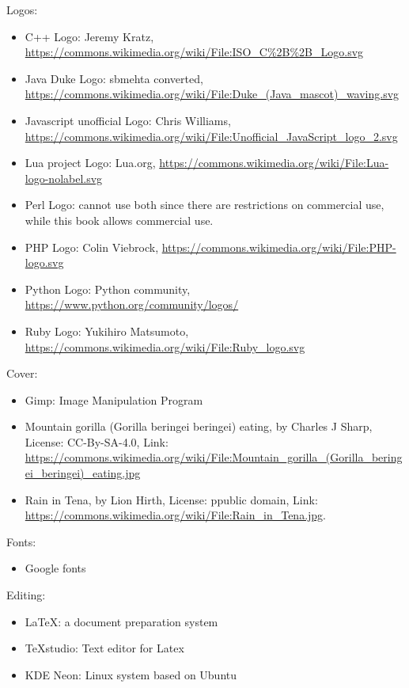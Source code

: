 \documentclass[12pt]{book}
\begin{document}
Logos: 
\begin{itemize}
	\item C++ Logo: Jeremy Kratz, \url{https://commons.wikimedia.org/wiki/File:ISO_C\%2B\%2B_Logo.svg}
	\item Java Duke Logo: sbmehta converted, \url{https://commons.wikimedia.org/wiki/File:Duke_(Java_mascot)_waving.svg}
	\item Javascript unofficial Logo: Chris Williams,  \url{https://commons.wikimedia.org/wiki/File:Unofficial_JavaScript_logo_2.svg}
	\item Lua project Logo: Lua.org, \url{https://commons.wikimedia.org/wiki/File:Lua-logo-nolabel.svg}
	\item Perl Logo: cannot use both since there are restrictions on commercial use, while this book allows commercial use.
	\item PHP Logo: Colin Viebrock, \url{https://commons.wikimedia.org/wiki/File:PHP-logo.svg}
	\item Python Logo: Python community, \url{https://www.python.org/community/logos/}
	\item Ruby Logo: Yukihiro Matsumoto, \url{https://commons.wikimedia.org/wiki/File:Ruby_logo.svg}
\end{itemize}

Cover:
\begin{itemize}
	\item Gimp: Image Manipulation Program
	\item Mountain gorilla (Gorilla beringei beringei) eating, by Charles J Sharp, License: CC-By-SA-4.0, Link: \url{https://commons.wikimedia.org/wiki/File:Mountain_gorilla_(Gorilla_beringei_beringei)_eating.jpg}
	\item Rain in Tena, by Lion Hirth, License: ppublic domain, Link: \url{https://commons.wikimedia.org/wiki/File:Rain_in_Tena.jpg}.
\end{itemize}

Fonts: 
\begin{itemize}
	\item Google fonts 
\end{itemize}

Editing:
\begin{itemize}
	\item \LaTeX: a document preparation system
	\item TeXstudio: Text editor for Latex
	\item KDE Neon: Linux system based on Ubuntu
\end{itemize}
\end{document}
